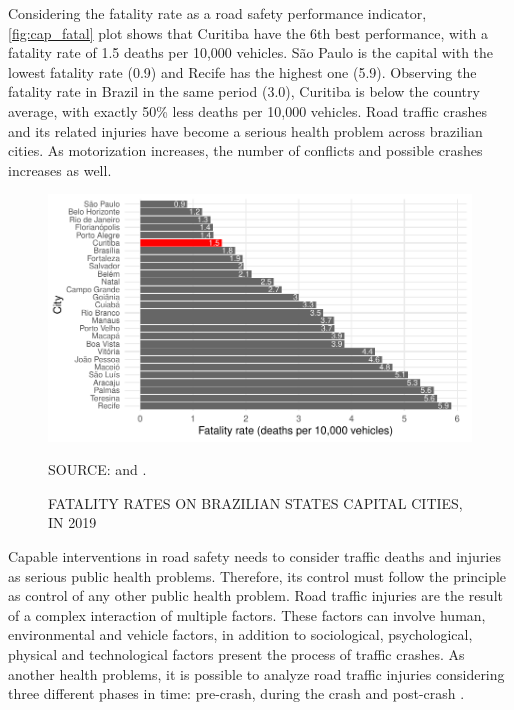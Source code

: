 Considering the fatality rate as a road safety performance indicator, \autoref{fig:cap_fatal} plot shows that Curitiba have the 6th best performance, with a fatality rate of 1.5 deaths per 10,000 vehicles. São Paulo is the capital with the lowest fatality rate (0.9) and Recife has the highest one (5.9). Observing the fatality rate in Brazil in the same period (3.0), Curitiba is below the country average, with exactly 50\% less deaths per 10,000 vehicles. Road traffic crashes and its related injuries have become a serious health problem across brazilian cities. As motorization increases, the number of conflicts and possible crashes increases as well.

\begin{figure}[!htbp]
    \centering\footnotesize
    \captionsetup{font=footnotesize}
    \caption{FATALITY RATES ON BRAZILIAN STATES CAPITAL CITIES, IN 2019}
    \includegraphics{fig/cap_fatal.pdf}
    \label{fig:cap_fatal}
    \par SOURCE: \textcite{MinistryofHealth2020} and \textcite{DENATRAN2020}.
\end{figure} 






Capable interventions in road safety needs to consider traffic deaths and injuries as serious public health problems. Therefore, its control must follow the principle as control of any other public health problem. Road traffic injuries are the result of a complex interaction of multiple factors. These factors can involve human, environmental and vehicle factors, in addition to sociological, psychological, physical and technological factors present the process of traffic crashes. As another health problems, it is possible to analyze road traffic injuries considering three different phases in time: pre-crash, during the crash and post-crash \cite{Mohan2016}. 

